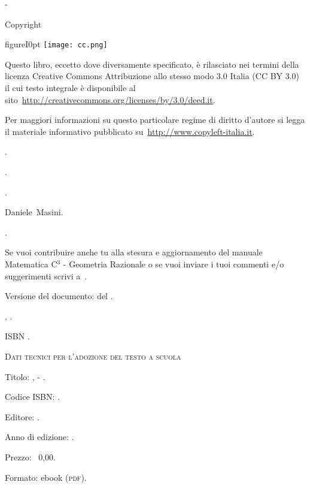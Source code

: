 
\thispagestyle{empty}
{\setlength{\parindent}{0em}\small{
\begin{center}
{\large{\serie{} - \titolo{}}}

Copyright {\textcopyright} \anno{} \editore{}
\end{center}

\begin{wrapfloat}{figure}{I}{0pt}
\texttt{[image: cc.png]}
\end{wrapfloat}

Questo libro, eccetto dove diversamente specificato, è rilasciato nei termini 
della licenza Creative Commons Attribuzione allo stesso modo 3.0 Italia
(CC BY 3.0) il cui testo integrale è disponibile al 
sito~\url{http://creativecommons.org/licenses/by/3.0/deed.it}.

Per maggiori informazioni su questo particolare regime di diritto d'autore si 
legga il materiale informativo pubblicato su~\url{http://www.copyleft-italia.it}.

 {\coord}.

 {\autori}.

 {\colab}.

 {Daniele~Masini}.

 {\texcol}.

 Se vuoi contribuire anche tu alla stesura e aggiornamento 
del manuale Matematica C$^3$ - Geometria Razionale o se  vuoi inviare i tuoi commenti e/o suggerimenti scrivi 
a~.

\vspace{2ex}
 Versione del documento: \docvers{} del \oggi{}\versnote{}.

 \EDIZIONE{}, \mese{} \anno{}.

 ISBN \mcisbn{}.

\vspace{2ex}
 {\scshape{Dati tecnici per l'adozione del testo a scuola}}

 Titolo: \serie, \titolo{} - \edizione{}.

 Codice ISBN: \mcisbn{}.

 Editore: \href{http://www.matematicamente.it}{\editore}. 

 Anno di edizione: \anno{}.

 Prezzo: \officialeuro{}~0,00.

 Formato: ebook (\scshape{pdf}).
}}
\cleardoublepage
